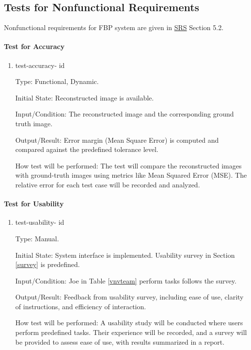 \documentclass[12pt, titlepage]{article}
\newcounter{testnum}
\newcommand{\dthetestnum}{id\thetestnum}
\begin{document}
\subsection{Tests for Nonfunctional Requirements} \label{TNFR}
Nonfunctional requirements for FBP system are given in
\href{https://github.com/marischan888/Computed-Tomography-Image-Reconstruction/blob/main/docs/SRS/SRS.pdf}{SRS}
Section 5.2.

\paragraph{Test for Accuracy}

\begin{enumerate}

\item{test-accuracy- \label{id7} \dthetestnum\\}

Type: Functional, Dynamic.

Initial State: Reconstructed image is available.

Input/Condition: The reconstructed image and the corresponding ground truth image.

Output/Result: Error margin (Mean Square Error) is computed and compared against the predefined tolerance level.

How test will be performed: The test will compare the reconstructed images with
ground-truth images using metrics like Mean Squared Error (MSE). The relative
error for each test case will be recorded and analyzed.

\end{enumerate}

\paragraph{Test for Usability}

\begin{enumerate}

\item{test-usability- \label{id8} \dthetestnum\\}

Type: Manual.

Initial State: System interface is implemented. Usability survey in Section
\ref{survey} is predefined.

Input/Condition: Joe in Table \ref{vnvteam} perform tasks follows the survey.

Output/Result: Feedback from usability survey, including ease of use, clarity of
instructions, and efficiency of interaction.

How test will be performed: A usability study will be conducted where users
perform predefined tasks. Their experience will be recorded, and a survey will
be provided to assess ease of use, with results summarized in a report.
\end{enumerate}
\end{document}
